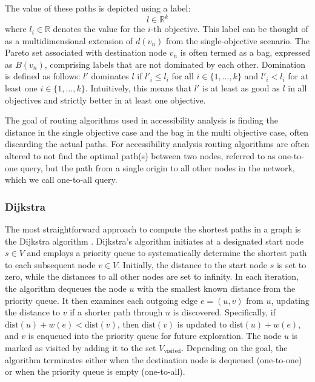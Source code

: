 The value of these paths is depicted using a label:
\[ l \in \mathbb{R}^k \]
where \( l_i \in \mathbb{R} \) denotes the value for the \( i \)-th objective.
This label can be thought of as a multidimensional extension of \( d(v_n) \) from the single-objective scenario.
The Pareto set associated with destination node \( v_n \) is often termed as a bag, expressed as \( B(v_n) \), comprising labels that are not dominated by each other.
Domination is defined as follows: \( l' \) dominates \( l \) if \( l'_i \leq l_i \) for all \( i \in \{1, \dots, k\} \) and \( l'_i < l_i \) for at least one \( i \in \{1, \dots, k\} \).
Intuitively, this means that \( l' \) is at least as good as \( l \) in all objectives and strictly better in at least one objective.

The goal of routing algorithms used in accessibility analysis is finding the distance in the single objective case and the bag in the multi objective case, often discarding the actual paths.
For accessibility analysis routing algorithms are often altered to not find the optimal path(s) between two nodes, referred to as one-to-one query, but the path from a single origin to all other nodes in the network, which we call one-to-all query.

\subsubsection{Dijkstra}
\label{subsubsec:dijkstra}
The most straightforward approach to compute the shortest paths in a graph is the Dijkstra algorithm \cite{dijkstra1959note}.
Dijkstra's algorithm initiates at a designated start node \( s \in V \) and employs a priority queue to systematically determine the shortest path to each subsequent node \( v \in V \).
Initially, the distance to the start node \( s \) is set to zero, while the distances to all other nodes are set to infinity.
In each iteration, the algorithm dequeues the node \( u \) with the smallest known distance from the priority queue.
It then examines each outgoing edge \( e = (u, v) \) from \( u \), updating the distance to \( v \) if a shorter path through \( u \) is discovered.
Specifically, if \( \text{dist}(u) + w(e) < \text{dist}(v) \), then \( \text{dist}(v) \) is updated to \( \text{dist}(u) + w(e) \), and \( v \) is enqueued into the priority queue for future exploration.
The node \( u \) is marked as visited by adding it to the set \( V_{\text{visited}} \).
Depending on the goal, the algorithm terminates either when the destination node is dequeued (one-to-one) or when the priority queue is empty (one-to-all).


